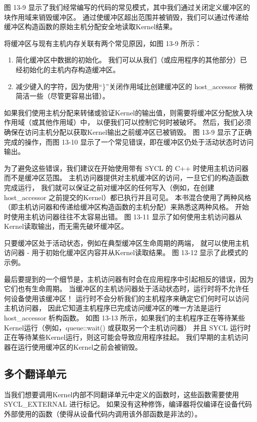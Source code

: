 图 13-9 显示了我们经常编写的代码的常见模式，其中我们通过关闭定义缓冲区的块作用域来销毁缓冲区。 
通过使缓冲区超出范围并被销毁，我们可以通过传递给缓冲区构造函数的原始主机分配安全地读取Kernel结果。

将缓冲区与现有主机内存关联有两个常见原因，如图 13-9 所示：

\begin{enumerate}
	\item 简化缓冲区中数据的初始化。 我们可以从我们（或应用程序的其他部分）已经初始化的主机内存构造缓冲区。

	\item 减少键入的字符，因为使用“\}”关闭作用域比创建缓冲区的 host\_accessor 稍微简洁一些（尽管更容易出错）。
\end{enumerate}

如果我们使用主机分配来转储或验证Kernel的输出值，则需要将缓冲区分配放入块作用域（或其他作用域）中，
以便我们可以控制它何时被破坏。 然后，我们必须确保在访问主机分配以获取Kernel输出之前缓冲区已被销毁。 
图 13-9 显示了正确完成的操作，而图 13-10 显示了一个常见错误，即在缓冲区仍处于活动状态时访问输出。

为了避免这些错误，我们建议在开始使用带有 SYCL 的 C++ 时使用主机访问器而不是缓冲区范围。 
主机访问器提供对主机缓冲区的访问，一旦它们的构造函数完成运行，
我们就可以保证之前对缓冲区的任何写入（例如，在创建 host\_accessor 之前提交的Kernel）都已执行并且可见。 
本书混合使用了两种风格（即主机访问器和传递给缓冲区构造函数的主机分配）来熟悉这两种风格。 
开始时使用主机访问器往往不太容易出错。 图 13-11 显示了如何使用主机访问器从Kernel读取输出，而无需先破坏缓冲区。

只要缓冲区处于活动状态，例如在典型缓冲区生命周期的两端，
就可以使用主机访问器 - 用于初始化缓冲区内容并从Kernel读取结果。 图 13-12 显示了此模式的示例。

最后要提到的一个细节是，主机访问器有时会在应用程序中引起相反的错误，因为它们也有生命周期。 
当缓冲区的主机访问器处于活动状态时，运行时将不允许任何设备使用该缓冲区！ 
运行时不会分析我们的主机程序来确定它们何时可以访问主机访问器，
因此它知道主机程序已完成访问缓冲区的唯一方法是运行 host\_accessor 析构函数。 
如图 13-13 所示，如果我们的主机程序正在等待某些Kernel运行（例如，queue::wait() 或获取另一个主机访问器）
并且 SYCL 运行时正在等待某些Kernel运行，则这可能会导致应用程序挂起。 
我们早期的主机访问器在运行使用缓冲区的Kernel之前会被销毁。

\subsection{多个翻译单元}
当我们想要调用Kernel内部不同翻译单元中定义的函数时，这些函数需要使用 SYCL\_EXTERNAL 进行标记。 
如果没有这种修饰，编译器将仅编译在设备代码外部使用的函数（使得从设备代码内调用该外部函数是非法的）。

